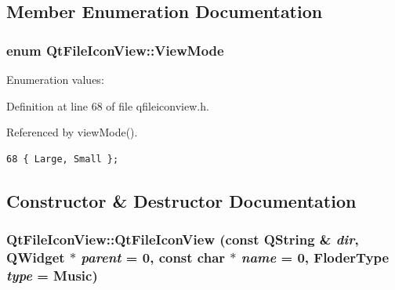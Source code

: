 \subsection{Member Enumeration Documentation}
\subsubsection{\setlength{\rightskip}{0pt plus 5cm}enum {\bf Qt\-File\-Icon\-View::View\-Mode}}\label{classQtFileIconView_QtFileIconVieww2}


\begin{Desc}
\item[Enumeration values: ]\par
\begin{description}
\item[{\em 
Large\label{classQtFileIconView_QtFileIconVieww2QtFileIconVieww0}
}]\item[{\em 
Small\label{classQtFileIconView_QtFileIconVieww2QtFileIconVieww1}
}]\end{description}
\end{Desc}



Definition at line 68 of file qfileiconview.h.

Referenced by view\-Mode().



\footnotesize\begin{verbatim}68 { Large, Small };
\end{verbatim}\normalsize 


\subsection{Constructor \& Destructor Documentation}
\subsubsection{\setlength{\rightskip}{0pt plus 5cm}Qt\-File\-Icon\-View::Qt\-File\-Icon\-View (const QString \& {\em dir}, {\bf QWidget} $\ast$ {\em parent} = 0, const char $\ast$ {\em name} = 0, {\bf Floder\-Type} {\em type} = Music)}\label{classQtFileIconView_QtFileIconViewa0}





